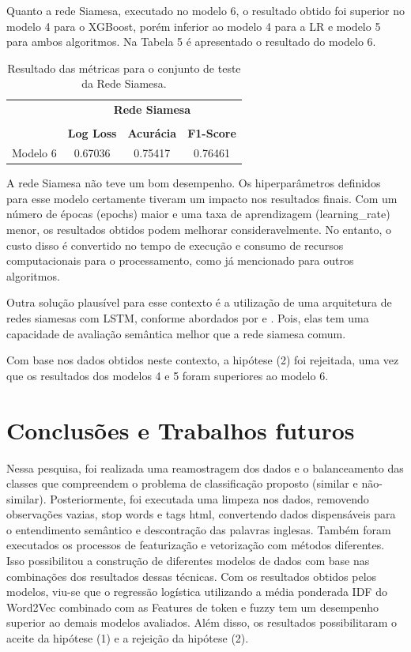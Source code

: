 \documentclass[conference]{IEEEtran}
\begin{document}
Quanto a rede Siamesa, executado no modelo 6, o resultado obtido foi superior no modelo 4 para o XGBoost, porém inferior ao modelo 4 para a LR e modelo 5 para ambos algoritmos. Na Tabela 5 é apresentado o resultado do modelo 6.

\begin{table}[]
\captionsetup{}
\caption{Resultado das métricas para o conjunto de teste da Rede Siamesa.} \label{tab:freq}
\setlength\tabcolsep{0pt} 
\footnotesize\centering
\smallskip 
\begin{tabular*}{\columnwidth}{@{\extracolsep{\fill}}rccc}
\toprule
  & \multicolumn{3}{c}{{\textbf{Rede Siamesa}}} \\
  \cmidrule(lr){2-4} \\
  & \textbf{Log Loss} & \textbf{Acurácia} & \textbf{F1-Score} \\
\midrule
    Modelo 6 & 0.67036 & 0.75417 & 0.76461 \\ 
\hline 
\bottomrule

\end{tabular*}
\end{table}

A rede Siamesa não teve um bom desempenho. Os hiperparâmetros definidos para esse modelo certamente tiveram um impacto nos resultados finais. Com um número de épocas (epochs) maior e uma taxa de aprendizagem (learning\_rate) menor, os resultados obtidos podem melhorar consideravelmente. No entanto, o custo disso é convertido no tempo de execução e consumo de recursos computacionais para o processamento, como já mencionado para outros algoritmos.

Outra solução plausível para esse contexto é a utilização de uma arquitetura de redes siamesas com LSTM, conforme abordados por \cite{Chen2017-2} e \cite{Chali2018}. Pois, elas tem uma capacidade de avaliação semântica melhor que a rede siamesa comum.

Com base nos dados obtidos neste contexto, a hipótese (2) foi rejeitada, uma vez que os resultados dos modelos 4 e 5 foram superiores ao modelo 6.

\section{Conclusões e Trabalhos futuros}
 
Nessa pesquisa, foi realizada uma reamostragem dos dados e o balanceamento das classes que compreendem o problema de classificação proposto (similar e não-similar). Posteriormente, foi executada uma limpeza nos dados, removendo observações vazias, stop words e tags html, convertendo dados dispensáveis para o entendimento semântico e descontração das palavras inglesas. Também foram executados os processos de featurização e vetorização com métodos diferentes. Isso possibilitou a construção de diferentes modelos de dados com base nas combinações dos resultados dessas técnicas. Com os resultados obtidos pelos modelos, viu-se que o regressão logística utilizando a média ponderada IDF do Word2Vec combinado com as Features de token e fuzzy tem um desempenho superior ao demais modelos avaliados. Além disso, os resultados possibilitaram o aceite da hipótese (1) e a rejeição da hipótese (2).
\end{document}
